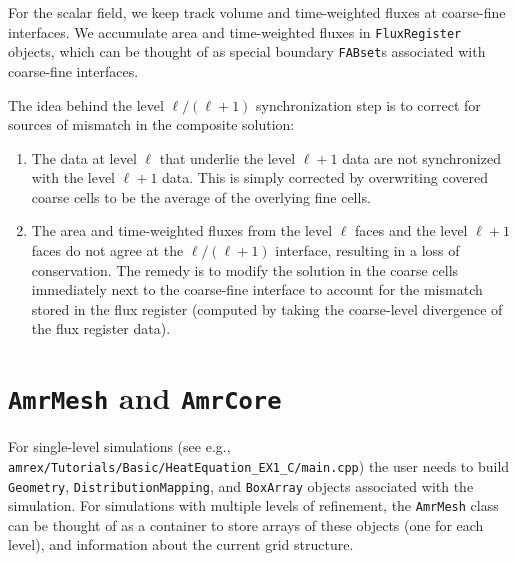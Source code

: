 For the scalar field, we keep track volume and time-weighted fluxes at coarse-fine interfaces.
We accumulate area and time-weighted fluxes in {\tt FluxRegister} objects, which can be
thought of as special boundary {\tt FABset}s associated with coarse-fine interfaces.

The idea behind the level $\ell/(\ell+1)$ synchronization step is to correct for sources of mismatch in the composite solution:
\begin{enumerate}
\item The data at level $\ell$ that underlie the level  $\ell+1$ data are not synchronized with the level $\ell+1$ data.
This is simply corrected by overwriting covered coarse cells to be the average of the overlying fine cells.
\item The area and time-weighted fluxes from the level $\ell$ faces and the level $\ell+1$ faces
do not agree at the $\ell/(\ell+1)$ interface, resulting in a loss of conservation.  
The remedy is to modify the solution in the coarse cells immediately next to the coarse-fine interface
to account for the mismatch stored in the flux register (computed by taking the coarse-level divergence of the
flux register data).
\end{enumerate}

\section{{\tt AmrMesh} and {\tt AmrCore}}

For single-level simulations
(see e.g., {\tt amrex/Tutorials/Basic/HeatEquation\_EX1\_C/main.cpp})
the user needs to build {\tt Geometry}, {\tt DistributionMapping},
and {\tt BoxArray} objects associated with the simulation.  For simulations
with multiple levels of refinement, the {\tt AmrMesh} class can be thought
of as a container to store arrays of these objects (one for each level), and
information about the current grid structure.


